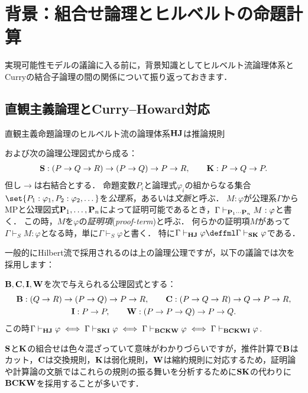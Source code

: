 \documentclass[realisability.tex]{subfiles}
\begin{document}
\section{背景：組合せ論理とヒルベルトの命題計算}
実現可能性モデルの議論に入る前に，背景知識としてヒルベルト流論理体系とCurryの結合子論理の間の関係について振り返っておきます．

\subsection{直観主義論理とCurry--Howard対応}
\begin{definition}[ヒルベルト流の論理体系$\HJ$]
 直観主義命題論理のヒルベルト流の論理体系$\HJ$は推論規則
 \begin{prooftree}
   
 \end{prooftree}
 および次の論理公理図式から成る：
 \begin{gather*}
  \S: (P \to Q \to R) \to (P \rightarrow Q) \to P \to R , \qquad \K: P \to Q \to P.
 \end{gather*}
 但し${\to}$は右結合とする．
 命題変数$P_i$と論理式$\varphi_i$の組からなる集合$\set{P_1 : \varphi_1, P_2: \varphi_2, \dots}$を\emph{公理系}，あるいは\emph{文脈}と呼ぶ．
 $M: \varphi$が公理系$\Gamma$から$\mathrm{MP}$と公理図式$\comb{P}_1, \dots, \comb{P}_n$によって証明可能であるとき，$\Gamma \vdash_{\comb{P}_1\cdots\comb{P}_n} M: \varphi$と書く．
 この時，$M$を$\varphi$の\emph{証明項}(\emph{proof-term})と呼ぶ．
 何らかの証明項$M$があって$\Gamma \vdash_S M: \varphi$となる時，単に$\Gamma \vdash_S \varphi$と書く．
 特に$\Gamma \vdash_{\HJ} \varphi \deffml \Gamma \vdash_{\S\K} \varphi$である．
\end{definition}
一般的にHilbert流で採用されるのは上の論理公理ですが，以下の議論では次を採用します：

\begin{theorem}
 $\B, \C, \I, \W$を次で与えられる公理図式とする：
 \begin{gather*}
  \B: (Q \to R) \to (P \to Q) \to P \to R, \qquad
  \C: (P \to Q \to R) \to Q \to P \to R, \\
  \I: P \to P, \qquad
  \W: (P \to P \to Q) \to P \to Q.
 \end{gather*}
 この時$\Gamma \vdash_{\HJ} \varphi \iff \Gamma \vdash_{\S\K\I} \varphi \iff \Gamma \vdash_{\B\C\K\W} \varphi \iff \Gamma \vdash_{\B\C\K\W\I} \varphi$.
\end{theorem}
$\S$と$\K$の組合せは色々混ざっていて意味がわかりづらいですが，推件計算で$\B$はカット，$\C$は交換規則，$\K$は弱化規則，$\W$は縮約規則に対応するため，証明論や計算論の文脈ではこれらの規則の振る舞いを分析するために$\S\K$の代わりに$\B\C\K\W$を採用することが多いです．
\end{document}

